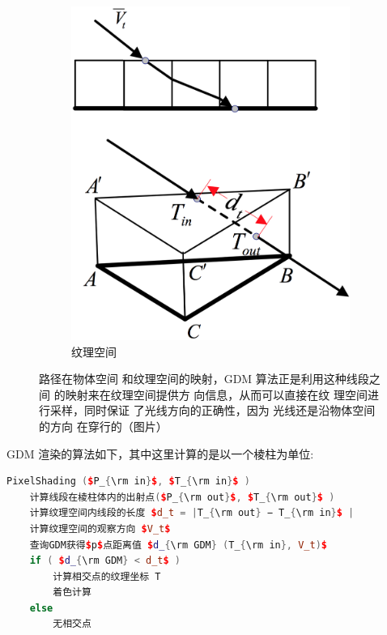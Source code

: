 \begin{figure}
\begin{center}
\begin{subfigure}[b]{0.35\textwidth}
		\includegraphics[width=\textwidth]{figures/df/GDM-texture-space-ray}
		\caption{纹理空间}
	\end{subfigure}
\end{center}
	\caption{路径在物体空间 和纹理空间的映射，GDM 算法正是利用这种线段之间 的映射来在纹理空间提供方 向信息，从而可以直接在纹 理空间进行采样，同时保证 了光线方向的正确性，因为 光线还是沿物体空间的方向 在穿行的（图片\cite{a:GeneralizedDisplacementMaps}）}
	\label{f:df-GDM-space-ray}
\end{figure}

GDM 渲染的算法如下，其中这里计算的是以一个棱柱为单位:

\begin{lstlisting}[language=C++, mathescape=true]
PixelShading ($P_{\rm in}$, $T_{\rm in}$ ) 
	计算线段在棱柱体内的出射点($P_{\rm out}$, $T_{\rm out}$ ) 
	计算纹理空间内线段的长度 $d_t = |T_{\rm out} − T_{\rm in}$ | 
	计算纹理空间的观察方向 $V_t$
	查询GDM获得$p$点距离值 $d_{\rm GDM} (T_{\rm in}, V_t)$
	if ( $d_{\rm GDM} < d_t$ )
		计算相交点的纹理坐标 T
		着色计算
	else
		无相交点
\end{lstlisting}

